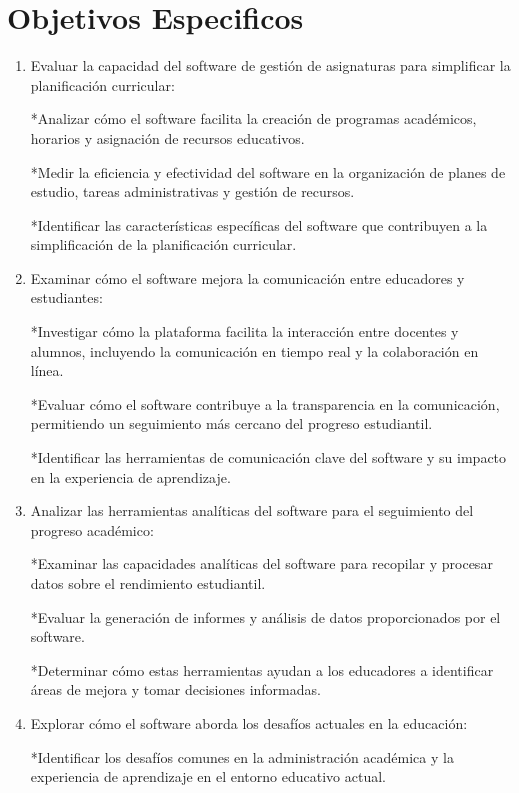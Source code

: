 \documentclass[11pt]{article}
\begin{document}
\section{Objetivos Especificos}
\begin{enumerate}
\item Evaluar la capacidad del software de gestión de
asignaturas para simplificar la planificación
curricular:

*Analizar cómo el software facilita la creación de
programas académicos, horarios y asignación de recursos
educativos.

*Medir la eficiencia y efectividad del software en la
organización de planes de estudio, tareas
administrativas y gestión de recursos.

*Identificar las características específicas del
software que contribuyen a la simplificación de la
planificación curricular.

\item Examinar cómo el software mejora la comunicación entre educadores y estudiantes:

*Investigar cómo la plataforma facilita la interacción
entre docentes y alumnos, incluyendo la comunicación en
tiempo real y la colaboración en línea.

*Evaluar cómo el software contribuye a la transparencia
en la comunicación, permitiendo un seguimiento más 
cercano del progreso estudiantil.

*Identificar las herramientas de comunicación clave del
software y su impacto en la experiencia de aprendizaje.

\item Analizar las herramientas analíticas del software
para el seguimiento del progreso académico:

*Examinar las capacidades analíticas del software para
recopilar y procesar datos sobre el rendimiento
estudiantil.

*Evaluar la generación de informes y análisis de datos
proporcionados por el software.

*Determinar cómo estas herramientas ayudan a los
educadores a identificar áreas de mejora y tomar
decisiones informadas.

\item Explorar cómo el software aborda los desafíos
actuales en la educación:

*Identificar los desafíos comunes en la administración
académica y la experiencia de aprendizaje en el entorno
educativo actual.



\end{enumerate}
\end{document}

